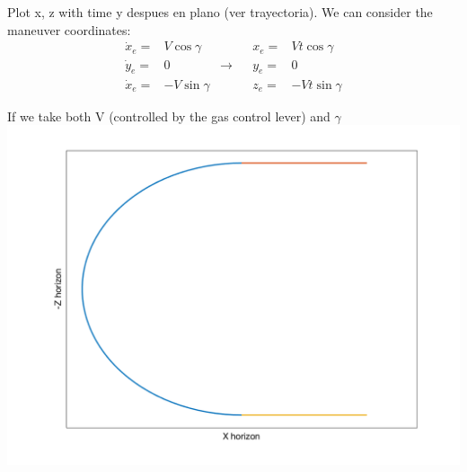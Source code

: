 Plot x, z with time y despues en plano (ver trayectoria).
We can consider the maneuver coordinates:
\begin{align*}
	\dot{x}_e=&V\cos\gamma&&&	x_e=&Vt\cos\gamma \\
	\dot{y}_e=&0& \rightarrow&&	y_e=&0\\
	\dot{x}_e=&-V\sin\gamma&&&z_e=&-Vt\sin\gamma
\end{align*}

If we take both V (controlled by the gas control lever) and $\gamma$ 
\includegraphics[width=\linewidth]{../matlab/trajectory.png}